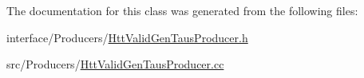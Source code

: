 The documentation for this class was generated from the following files:\begin{DoxyCompactItemize}
\item 
interface/Producers/\hyperlink{HttValidGenTausProducer_8h}{HttValidGenTausProducer.h}\item 
src/Producers/\hyperlink{HttValidGenTausProducer_8cc}{HttValidGenTausProducer.cc}\end{DoxyCompactItemize}
